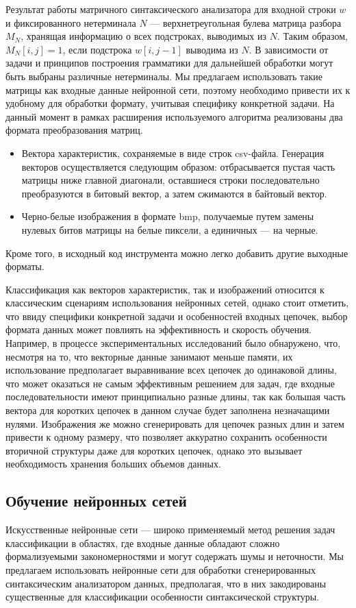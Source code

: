 \documentclass[14pt]{matmex-diploma-custom}
\begin{document}
Результат работы матричного синтаксического анализатора для входной строки $w$ и фиксированного нетерминала  $N$ --- верхнетреугольная булева матрица разбора $M_N$, хранящая информацию о всех подстроках, выводимых из $N$. Таким образом, $M_N[i,j]=1$, если подстрока $w[i,j-1]$  выводима из $N$. В зависимости от задачи и принципов построения грамматики для дальнейшей обработки могут быть выбраны различные нетерминалы. Мы предлагаем использовать такие матрицы как входные данные нейронной сети, поэтому необходимо привести их к удобному для обработки формату, учитывая специфику конкретной задачи. На данный момент в рамках расширения используемого алгоритма реализованы два формата преобразования матриц.
\begin{itemize}
    \item Вектора характеристик, сохраняемые в виде строк csv-файла. Генерация векторов осуществляется следующим образом: отбрасывается пустая часть матрицы ниже главной диагонали, оставшиеся строки последовательно преобразуются в битовый вектор, а затем сжимаются в байтовый вектор.
    \item Черно-белые изображения в формате bmp, получаемые путем замены нулевых битов матрицы на белые пиксели, а единичных --- на черные.
\end{itemize}
Кроме того, в исходный код инструмента можно легко добавить другие выходные форматы.

Классификация как векторов характеристик, так и изображений относится к классическим сценариям использования нейронных сетей, однако стоит отметить, что ввиду специфики конкретной задачи и особенностей входных цепочек, выбор формата данных может повлиять на эффективность и скорость обучения. Например, в процессе экспериментальных исследований было обнаружено, что, несмотря на то, что векторные данные занимают меньше памяти, их использование предполагает выравнивание всех цепочек до одинаковой длины, что может оказаться не самым эффективным решением для задач, где входные последовательности имеют принципиально разные длины, так как большая часть вектора для коротких цепочек в данном случае будет заполнена незначащими нулями. Изображения же можно сгенерировать для цепочек разных длин и затем привести к одному размеру, что позволяет аккуратно сохранить особенности вторичной структуры даже для коротких цепочек, однако это вызывает необходимость хранения больших объемов данных.

\subsection{Обучение нейронных сетей}
Искусственные нейронные сети --- широко применяемый метод решения задач классификации в областях, где входные данные обладают сложно формализуемыми закономерностями и могут содержать шумы и неточности. Мы предлагаем использовать нейронные сети для обработки сгенерированных синтаксическим анализатором данных, предполагая, что в них закодированы существенные для классификации особенности синтаксической структуры.
\end{document}
